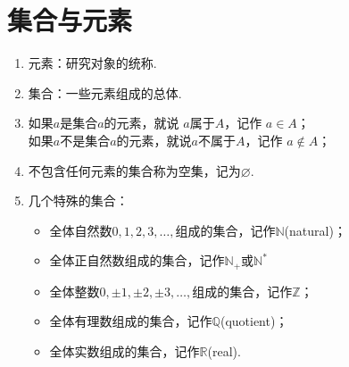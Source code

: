   \Teach{}
  \newtheorem*{Theorem}{定理}
  \makefront

\startexercise
\section{集合与元素}
  \begin{framed}\hspace{-25pt}{\heiti 知识点}
    \begin{enumerate}
      \item {\fangsong 元素}：研究对象的统称.
      \item {\fangsong 集合}：一些元素组成的总体.
      \item 如果$a$是集合$a$的元素，就说 $a${\fangsong 属于}$A$，记作 $a \in A$；\\
            如果$a$不是集合$a$的元素，就说$a${\fangsong 不属于}$A$，记作 $a \notin A$；
      \item 不包含任何元素的集合称为{\fangsong 空集}，记为$\varnothing$.
      \item 几个特殊的集合：
        \begin{itemize}
          \item 全体{\fangsong 自然数}$0,1,2,3,\ldots ,$组成的集合，记作$\mathbb{N}$(natural)；
          \item 全体正自然数组成的集合，记作$\mathbb{N}_+$或$\mathbb{N}^*$
          \item 全体{\fangsong 整数}$0,\pm1,\pm2,\pm3,\ldots ,$组成的集合，记作$\mathbb{Z}$；
          \item 全体{\fangsong 有理数}组成的集合，记作$\mathbb{Q}$(quotient)；
          \item 全体{\fangsong 实数}组成的集合，记作$\mathbb{R}$(real).
        \end{itemize}
    \end{enumerate}
  \end{framed}

